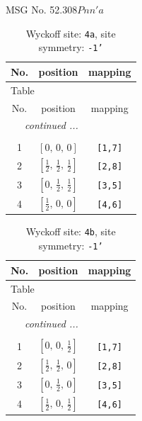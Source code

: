 \documentclass[fleqn,8pt]{jsarticle}
\begin{document}
\setcounter{MaxMatrixCols}{32}

\renewcommand{\tablename}{Table~}
\renewcommand{\figurename}{Figure~}
\begin{center}
\LARGE
MSG No. 52.308\quad$Pnn'a$
\end{center}
\renewcommand{\arraystretch}{1.2}
\begin{longtable}{ccc}
\caption{Wyckoff site: {\tt 4a}, site symmetry: {\tt -1'}}
 \\
 \hline \hline
No. & position & mapping \\ \hline \endfirsthead

\multicolumn{2}{l}{\tablename\ \thetable{}} \\
 \hline \hline
No. & position & mapping \\ \hline \endhead

 \hline \hline
\multicolumn{2}{r}{\footnotesize\it continued ...} \\ \endfoot

 \hline \hline
\multicolumn{2}{r}{} \\ \endlastfoot

1 & $\left[ 0,\, 0,\, 0 \right]$ & {\tt [1,7]} \\ \hline
2 & $\left[ \frac{1}{2},\, \frac{1}{2},\, \frac{1}{2} \right]$ & {\tt [2,8]} \\ \hline
3 & $\left[ 0,\, \frac{1}{2},\, \frac{1}{2} \right]$ & {\tt [3,5]} \\ \hline
4 & $\left[ \frac{1}{2},\, 0,\, 0 \right]$ & {\tt [4,6]} \\
\end{longtable}
\renewcommand{\arraystretch}{1.2}
\begin{longtable}{ccc}
\caption{Wyckoff site: {\tt 4b}, site symmetry: {\tt -1'}}
 \\
 \hline \hline
No. & position & mapping \\ \hline \endfirsthead

\multicolumn{2}{l}{\tablename\ \thetable{}} \\
 \hline \hline
No. & position & mapping \\ \hline \endhead

 \hline \hline
\multicolumn{2}{r}{\footnotesize\it continued ...} \\ \endfoot

 \hline \hline
\multicolumn{2}{r}{} \\ \endlastfoot

1 & $\left[ 0,\, 0,\, \frac{1}{2} \right]$ & {\tt [1,7]} \\ \hline
2 & $\left[ \frac{1}{2},\, \frac{1}{2},\, 0 \right]$ & {\tt [2,8]} \\ \hline
3 & $\left[ 0,\, \frac{1}{2},\, 0 \right]$ & {\tt [3,5]} \\ \hline
4 & $\left[ \frac{1}{2},\, 0,\, \frac{1}{2} \right]$ & {\tt [4,6]} \\
\end{longtable}
\end{document}
